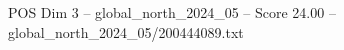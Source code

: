 \begin{textsample}{POS Dim 3 – global\_north\_2024\_05 – Score 24.00 – global\_north\_2024\_05/200444089.txt}
\end{textsample}
